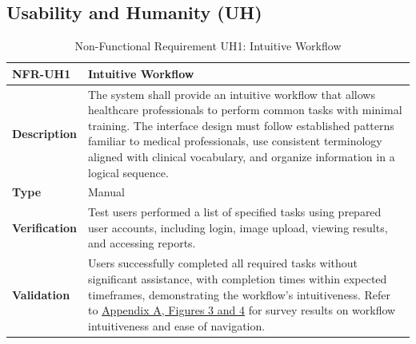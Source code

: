 \documentclass[12pt, titlepage]{article}
\begin{document}
\subsection{Usability and Humanity (UH)}
\begin{table}[H]
\centering
{}
\begin{tabular}{|p{3.5cm}|p{11.5cm}|}
\hline
\rowcolor{gray!30}
\textbf{NFR-UH1} & \textbf{Intuitive Workflow} \\
\hline
\textbf{Description} & The system shall provide an intuitive workflow that allows healthcare professionals to perform common tasks with minimal training. The interface design must follow established patterns familiar to medical professionals, use consistent terminology aligned with clinical vocabulary, and organize information in a logical sequence. \\
\hline
\textbf{Type} & Manual \\
\hline
\textbf{Verification} & Test users performed a list of specified tasks using prepared user accounts, including login, image upload, viewing results, and accessing reports.\\
\hline
\textbf{Validation} & Users successfully completed all required tasks without significant assistance, with completion times within expected timeframes, demonstrating the workflow's intuitiveness. Refer to \hyperref[appendix:A]{Appendix A, Figures 3 and 4} for survey results on workflow intuitiveness and ease of navigation. \\
\hline
\end{tabular}
\caption{Non-Functional Requirement UH1: Intuitive Workflow}
\end{table}
\end{document}
